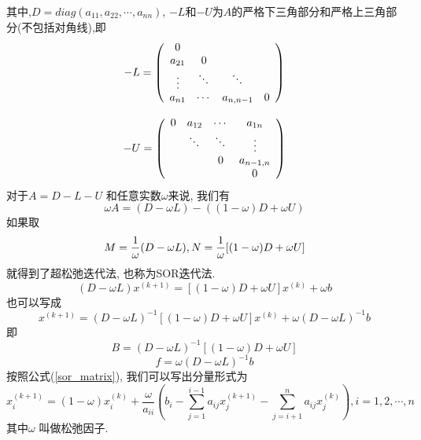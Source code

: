 \documentclass[a4paper]{article}
\begin{document}
\begin{CJK*}{GBK}{song}
其中,$D=diag(a_{11},a_{22},\cdots,a_{nn})$, $-L$和$-U$为$A$的严格下三角部分和严格上三角部分(不包括对角线),即
$$-L= \left(                 %
            \begin{array}{cccc}   %
            0      &   &    &  \\  %
            a_{21} & 0 &    &  \\  %
            \rotatebox{-90}{$\cdots$}&\rotatebox{-45}{$\cdots$}&\rotatebox{-45}{$\cdots$}& \\
            a_{n1} & \cdots & a_{n, n-1} & 0 \\
            \end{array}
            \right)                 %
$$

$$-U= \left(                 %
            \begin{array}{cccc}   %
            0      & a_{12}  & \cdots  & a_{1n}  \\  %
                   & \rotatebox{-45}{$\cdots$} & \rotatebox{-45}{$\cdots$} & \rotatebox{-90}{$\cdots$} \\  %
                   &         & 0 & a_{n-1,n}\\
                   & & & 0 \\
            \end{array}
            \right)                 %
$$
对于$A=D-L-U$ 和任意实数$\omega$来说, 我们有
\begin{equation}
\omega A=(D-\omega L)-((1-\omega)D+\omega U)
\end{equation}
如果取
\begin{equation}
M=\frac{1}{\omega}(D-\omega L),\\ N=\frac{1}{\omega}[(1-\omega)D+\omega U]
\end{equation}
就得到了超松弛迭代法, 也称为SOR迭代法.
\begin{equation}\label{sor_matrix}
(D-\omega L)x^{(k+1)}=[(1-\omega)D+\omega U]x^{(k)}+\omega b
\end{equation}
也可以写成
\begin{equation}
x^{(k+1)}=(D-\omega L)^{-1}[(1-\omega)D+\omega U]x^{(k)}+\omega(D-\omega L)^{-1} b
\end{equation}
即$$B=(D-\omega L)^{-1}[(1-\omega)D+\omega U]$$
$$f=\omega(D-\omega L)^{-1} b$$
按照公式(\ref{sor_matrix}), 我们可以写出分量形式为
\begin{equation}
x_i^{(k+1)}=(1-\omega)x_i^{(k)}+\frac{\omega}{a_{ii}}\left  (b_i-\displaystyle{\sum_{j=1}^{i-1}}a_{ij}x_j^{(k+1)}-\displaystyle{\sum_{j=i+1}^{n}}a_{ij}x_j^{(k)}\right),i=1,2,\cdots,n
\end{equation}
其中$\omega$ 叫做松弛因子.


\end{CJK*}
\end{document}

